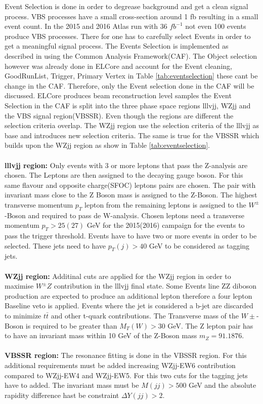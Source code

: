 \documentclass[../Bachelorarbeit.tex]{subfiles}
\begin{document}
Event Selection is done in order to degrease background and get a clean signal process. VBS processes have
a small cross-section around 1 fb resulting in a small event count. In the 2015 and 2016 Atlas
run with 36 $fb^{-1}$ not even 100 events produce VBS processes.
There for one has to carefully select Events in order to get a meaningful signal process. The Events Selection is implemented
as described in \cite{Bittrich.27.05.2020} using the Common Analysis Framework(CAF). The Object selection however was already done in ELCore
and account for the Event cleaning, GoodRunList, Trigger, Primary Vertex in Table \ref{tab:eventselection} these cant be change in the CAF.
Therefore, only the Event selection done in the CAF will be discussed. ELCore produces beam reconstruction
level samples the Event Selection in the CAF is split into the three phase space regions lllvjj, WZjj and the VBS signal region(VBSSR).
Even though the regions are different the selection criteria overlap. The WZjj region use the selection criteria of
the lllvjj as base and introduces new selection criteria.
The same is true for the VBSSR which builds upon the WZjj region as show in Table \ref{tab:eventselection}.
\\\\
\textbf{lllvjj region:} Only events with 3 or more leptons that pass the Z-analysis are chosen. The Leptons are then assigned to the decaying gauge boson.
For this same flavour and opposite charge(SFOC) leptons pairs are chosen. The pair with invariant mass close to the Z Boson mass is assigned to the Z-Boson.
The highest transverse momentum $p_{T}$ lepton from the remaining leptons is assigned to the $W^{\pm}$-Boson and required to pass de W-analysis.
Chosen leptons need a transverse momentum $p_{T} > 25(27)$ GeV for the 2015(2016) campaign for the events to pass the trigger threshold.
Events have to have two or more events in order to be selected. These jets need to have $p_{T}(j)>40$ GeV to be considered as tagging jets.
\\\\
\textbf{WZjj region:} Additinal cuts are applied for the WZjj region in order to maximise $W^{\pm}Z$ contribution in the lllvjj final state.
Some Events line ZZ diboson production are expected to produce an additional lepton therefore a four lepton Baseline veto is applied.
Events where the jet is considered a b-jet are discarded to minimize $t\bar{t}$ and other t-quark contributions.
The Transverse mass of the $W{\pm}$-Boson is required to be greater than $M_{T}(W)>30$ GeV.
The Z lepton pair has to have an invariant mass within 10 GeV of the Z-Boson mass $m_{Z}=91.1876$.
\\\\
\textbf{VBSSR region:} The resonance fitting is done in the VBSSR region. For this additional requirements must be added
increasing WZjj-EW6 contribution compared to WZjj-EW4 and WZjj-EW5. For this two cuts for the tagging jets have to added. The invariant mass must be
$M(jj)>500$ GeV and the absolute rapidity difference hast be constraint $\Delta Y(jj) >2$.
\\\\
\end{document}

